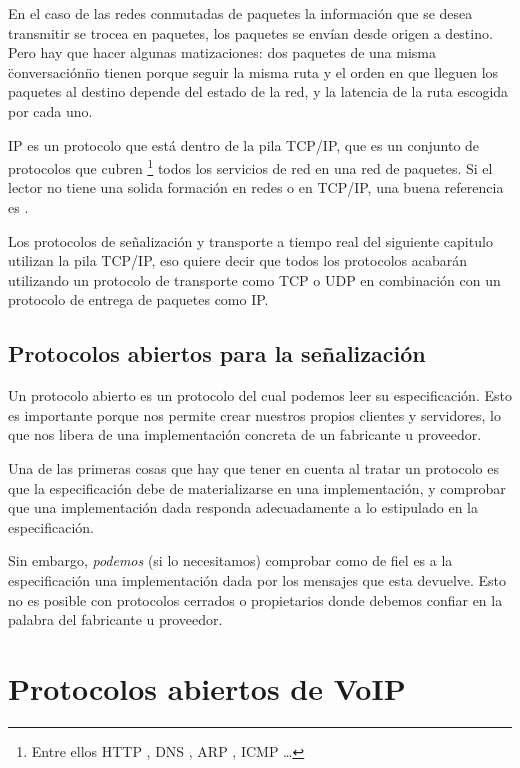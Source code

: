 En el caso de las redes conmutadas de paquetes la información que se desea transmitir se trocea en paquetes, los paquetes se envían desde origen a destino. Pero hay que hacer algunas matizaciones: dos paquetes de una misma \"conversación\" no tienen porque seguir la misma ruta y el orden en que lleguen los paquetes al destino depende del estado de la red, y la latencia de la ruta escogida por cada uno.

IP es un protocolo que está dentro de la pila TCP/IP, que es un conjunto de protocolos que cubren \footnote{Entre ellos HTTP , DNS , ARP , ICMP \ldots} todos los servicios de red en una red de paquetes. Si el lector no tiene una solida formación en redes o en TCP/IP, una buena referencia es \cite{Stallings07}.

Los protocolos de señalización y transporte a tiempo real del siguiente capitulo utilizan la pila TCP/IP, eso quiere decir que todos los protocolos acabarán utilizando un protocolo de transporte como TCP o UDP en combinación con un protocolo de entrega de paquetes como IP.



\subsection{Protocolos abiertos para la señalización}

Un protocolo abierto es un protocolo del cual podemos leer su especificación. Esto es importante porque nos permite crear nuestros propios clientes y servidores, lo que nos libera de una implementación concreta de un fabricante u proveedor.

Una de las primeras cosas que hay que tener en cuenta al tratar un protocolo es que la especificación debe de materializarse en una implementación, y comprobar que una implementación dada responda adecuadamente a lo estipulado en la especificación.

Sin embargo, \emph{podemos} (si lo necesitamos) comprobar como de fiel es a la especificación una implementación dada por los mensajes que esta devuelve. Esto no es posible con protocolos cerrados o propietarios donde debemos confiar en la palabra del fabricante u proveedor.




\section{Protocolos abiertos de VoIP}
\label{sec:prot-abiert-de}


